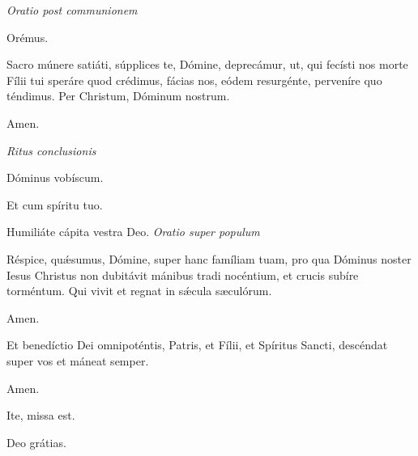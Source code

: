 \textit{Oratio post communionem}

Orémus.

Sacro múnere satiáti, súpplices te, Dómine, deprecámur, ut, qui fecísti nos morte Fílii tui speráre quod crédimus, fácias nos, eódem resurgénte, perveníre quo téndimus. Per Christum, Dóminum nostrum.

\Rbardot{} Amen.

\textit{Ritus conclusionis}

\Vbardot{} Dóminus vobíscum.

\Rbardot{} Et cum spíritu tuo.

\Vbardot{} Humiliáte cápita vestra Deo.{\mbox{}\hspace{2.4cm}\mbox{}} \textit{Oratio super populum}

Réspice, quǽsumus, Dómine, super hanc famíliam tuam, pro qua Dóminus noster Iesus Christus non dubitávit mánibus tradi nocéntium, et crucis subíre torméntum. Qui vivit et regnat in sǽcula sæculórum.

\Rbardot{} Amen.

Et benedíctio Dei omnipoténtis, Patris, et Fílii, \grecross{} et Spíritus Sancti, descéndat super vos et máneat semper.

\Rbardot{} Amen.

\Vbardot{} Ite, missa est.

\Rbardot{} Deo grátias.
